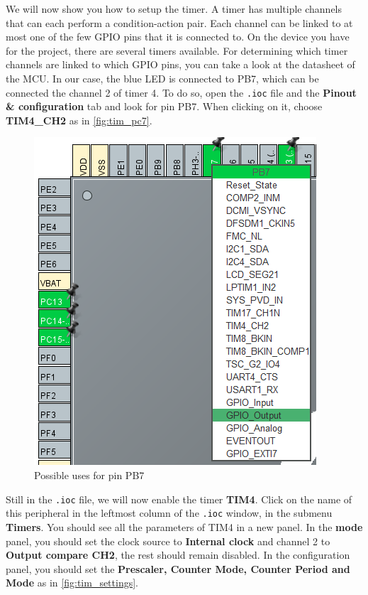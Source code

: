 We will now show you how to setup the timer. A timer has multiple channels that can each perform a condition-action pair. Each channel can be linked to at most one of the few GPIO pins that it is connected to. On the device you have for the project, there are several timers available. For determining which timer channels are linked to which GPIO pins, you can take a look at the datasheet of the MCU. In our case, the blue LED is connected to PB7, which can be connected the channel 2 of timer 4. To do so, open the \texttt{.ioc} file and the \textbf{Pinout \& configuration} tab and look for pin PB7. When clicking on it, choose \textbf{TIM4\_CH2} as in \autoref{fig:tim_pc7}.
\begin{figure}[h]
    \centering
    \includegraphics[scale=0.5]{figures/timer_pb7.png}
    \caption{Possible uses for pin PB7}
    \label{fig:tim_pc7}
\end{figure}
Still in the \texttt{.ioc} file, we will now enable the timer \textbf{TIM4}. Click on the name of this peripheral in the leftmost column of the \texttt{.ioc} window, in the submenu \textbf{Timers}. You should see all the parameters of TIM4 in a new panel. In the \textbf{mode} panel, you should set the clock source to \textbf{Internal clock} and channel 2 to \textbf{Output compare CH2}, the rest should remain disabled. In the configuration panel, you should set the \textbf{Prescaler, Counter Mode, Counter Period and Mode} as in \autoref{fig:tim_settings}.

